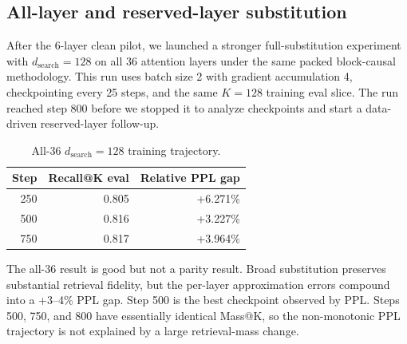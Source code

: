 \documentclass[10pt]{article}
\begin{document}
\subsection{All-layer and reserved-layer substitution}
After the 6-layer clean pilot, we launched a stronger full-substitution
experiment with $d_{\mathrm{search}}=128$ on all 36 attention layers under the
same packed block-causal methodology. This run uses batch size 2 with gradient
accumulation 4, checkpointing every 25 steps, and the same $K=128$ training eval
slice. The run reached step 800 before we stopped it to analyze checkpoints and
start a data-driven reserved-layer follow-up.

\begin{table}[h]
\centering
\caption{All-36 $d_{\mathrm{search}}=128$ training trajectory.}
\begin{tabular}{rrr}
\toprule
Step & Recall@K eval & Relative PPL gap\\
\midrule
250 & 0.805 & +6.271\%\\
500 & 0.816 & +3.227\%\\
750 & 0.817 & +3.964\%\\
\bottomrule
\end{tabular}
\end{table}

The all-36 result is good but not a parity result. Broad substitution preserves
substantial retrieval fidelity, but the per-layer approximation errors compound
into a +3--4\% PPL gap. Step 500 is the best checkpoint observed by PPL. Steps
500, 750, and 800 have essentially identical Mass@K, so the non-monotonic PPL
trajectory is not explained by a large retrieval-mass change.
\end{document}
